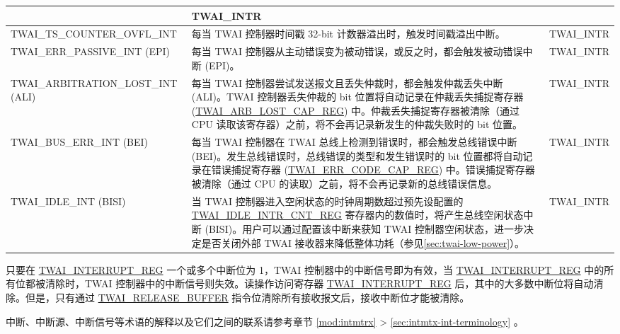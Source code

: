 \documentclass[main\_\_CN.tex]{subfiles}
\begin{document}
\begin{longtable}{ | L{5cm} | L{7cm} | L{3.5cm} | }
& TWAI\_INTR \\ \hline
\label{int:TWAITSCOUNTEROVFLINT}TWAI\_TS\_COUNTER\_OVFL\_INT &
每当 TWAI 控制器时间戳 32-bit 计数器溢出时，触发时间戳溢出中断。
& TWAI\_INTR \\ \hline
\label{int:TWAIERRPASSIVEINT}TWAI\_ERR\_PASSIVE\_INT (EPI) &
每当 TWAI 控制器从主动错误变为被动错误，或反之时，都会触发被动错误中断 (EPI)。
& TWAI\_INTR \\ \hline
\label{int:TWAIARBITRATIONLOSTINT}TWAI\_ARBITRATION\_LOST\_INT (ALI) &
每当 TWAI 控制器尝试发送报文且丢失仲裁时，都会触发仲裁丢失中断 (ALI)。TWAI 控制器丢失仲裁的 bit 位置将自动记录在仲裁丢失捕捉寄存器 (\hyperref[regdesc:TWAIARBLOSTCAPREG]{TWAI\_ARB\_LOST\_CAP\_REG}) 中。仲裁丢失捕捉寄存器被清除（通过 CPU 读取该寄存器）之前，将不会再记录新发生的仲裁失败时的 bit 位置。
& TWAI\_INTR \\ \hline
\label{int:TWAIBUSERRINT}TWAI\_BUS\_ERR\_INT (BEI) &
每当 TWAI 控制器在 TWAI 总线上检测到错误时，都会触发总线错误中断 (BEI)。发生总线错误时，总线错误的类型和发生错误时的 bit 位置都将自动记录在错误捕捉寄存器 (\hyperref[regdesc:TWAIERRCODECAPREG]{TWAI\_ERR\_CODE\_CAP\_REG}) 中。错误捕捉寄存器被清除（通过 CPU 的读取）之前，将不会再记录新的总线错误信息。
& TWAI\_INTR \\ \hline
\label{int:TWAIIDLEINT}TWAI\_IDLE\_INT (BISI) &
当 TWAI 控制器进入空闲状态的时钟周期数超过预先设配置的 \hyperref[regdesc:TWAIIDLEINTRCNTREG]{TWAI\_IDLE\_INTR\_CNT\_REG} 寄存器内的数值时，将产生总线空闲状态中断 (BISI)。用户可以通过配置该中断来获知 TWAI 控制器空闲状态，进一步决定是否关闭外部 TWAI 接收器来降低整体功耗（参见\ref{sec:twai-low-power}）。
& TWAI\_INTR \\ \hline
\end{longtable}



只要在 \hyperref[regdesc:TWAIINTERRUPTREG]{TWAI\_INTERRUPT\_REG} 一个或多个中断位为 1，TWAI 控制器中的中断信号即为有效，当 \hyperref[regdesc:TWAIINTERRUPTREG]{TWAI\_INTERRUPT\_REG} 中的所有位都被清除时，TWAI 控制器中的中断信号则失效。读操作访问寄存器 \hyperref[regdesc:TWAIINTERRUPTREG]{TWAI\_INTERRUPT\_REG} 后，其中的大多数中断位将自动清除。但是，只有通过 \hyperref[fielddesc:TWAIRELEASEBUFFER]{TWAI\_RELEASE\_BUFFER} 指令位清除所有接收报文后，接收中断位才能被清除。

\begin{tiplisting}
中断、中断源、中断信号等术语的解释以及它们之间的联系请参考章节 \ref{mod:intmtrx} \textit{} > \ref{sec:intmtx-int-terminology} \textit{}。
\end{tiplisting}
\end{document}
